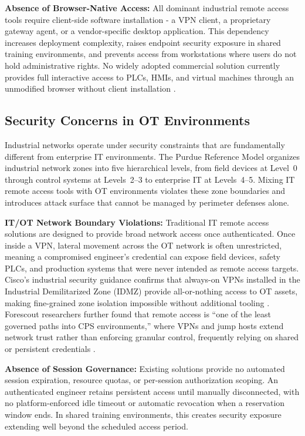 \textbf{Absence of Browser-Native Access:} All dominant industrial remote
access tools require client-side software installation - a VPN client,
a proprietary gateway agent, or a vendor-specific desktop application.
This dependency increases deployment complexity, raises endpoint security
exposure in shared training environments, and prevents access from workstations
where users do not hold administrative rights. No widely adopted commercial
solution currently provides full interactive access to PLCs, HMIs, and
virtual machines through an unmodified browser without client installation
{\footnotesize\cite{secomea-state-2026,forescout-rdp-vnc-2025}}.

\subsection{Security Concerns in OT Environments}

Industrial networks operate under security constraints that are fundamentally
different from enterprise IT environments. The Purdue Reference Model organizes
industrial network zones into five hierarchical levels, from field devices at
Level~0 through control systems at Levels~2--3 to enterprise IT at Levels~4--5.
Mixing IT remote access tools with OT environments violates these zone boundaries
and introduces attack surface that cannot be managed by perimeter defenses alone.

\textbf{IT/OT Network Boundary Violations:} Traditional IT remote access
solutions are designed to provide broad network access once authenticated.
Once inside a VPN, lateral movement across the OT network is often unrestricted,
meaning a compromised engineer's credential can expose field devices, safety
PLCs, and production systems that were never intended as remote access targets.
Cisco's industrial security guidance confirms that always-on VPNs installed in
the Industrial Demilitarized Zone (IDMZ) provide all-or-nothing access to OT
assets, making fine-grained zone isolation impossible without additional
tooling {\footnotesize\cite{cisco-sea-brief}}. Forescout researchers further
found that remote access is ``one of the least governed paths into CPS
environments,'' where VPNs and jump hosts extend network trust rather than
enforcing granular control, frequently relying on shared or persistent
credentials {\footnotesize\cite{forescout-rdp-vnc-2025}}.

\textbf{Absence of Session Governance:} Existing solutions provide no automated
session expiration, resource quotas, or per-session authorization scoping.
An authenticated engineer retains persistent access until manually disconnected,
with no platform-enforced idle timeout or automatic revocation when a reservation
window ends. In shared training environments, this creates security exposure
extending well beyond the scheduled access period.

